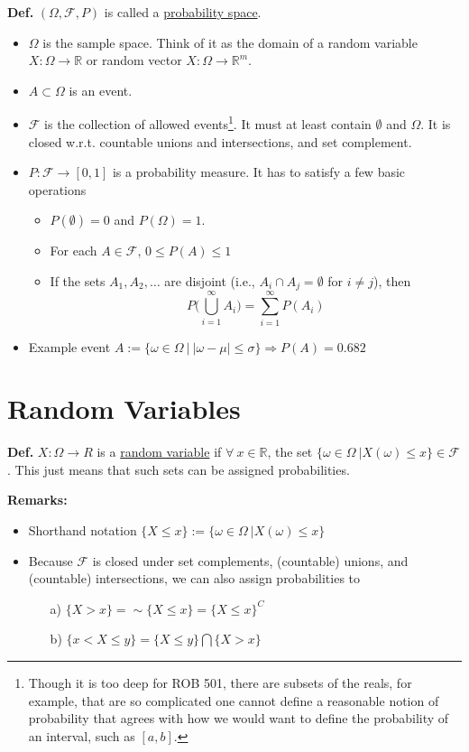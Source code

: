 \documentclass[letterpaper]{article}
\newcommand{\real}{\mathbb R}  %
\begin{document}
\textbf{Def.}  $(\Omega, \mathscr{F}, P)$ is called a \ul{probability space}.
\begin{itemize}
\item $\Omega$ is the sample space. Think of it as the domain of a random variable $X: \Omega \to \real$ or random vector $X: \Omega \to \real^m$.
\item $A \subset \Omega$ is an event.
\item $\mathscr{F}$ is the collection of allowed events\footnote{Though it is too deep for ROB 501, there are subsets of the reals, for example, that are so complicated one cannot define a reasonable notion of probability that agrees with how we would want to define the probability of an interval, such as $[a, b]$.}. It must at least contain $\emptyset$ and $\Omega$. It is closed w.r.t. countable unions and intersections, and set complement.
    \item $P:\mathscr{F} \to [0, 1]$ is a probability measure. It has to satisfy a few basic operations
    \begin{itemize}
    \item $P(\emptyset)=0$ and $P(\Omega)=1$.
    \item For each $A \in \mathscr{F}$, $0 \le P(A) \le 1$
    \item If the sets $A_1, A_2, \ldots $ are disjoint (i.e., $A_i \cap A_j = \emptyset$ for $i \neq j$), then
    $$P\big(\bigcup_{i=1}^{\infty}A_i\big) = \sum_{i=1}^{\infty} P(A_i) $$
    \end{itemize}
\item Example event $A:=\{ \omega \in \Omega ~ |~ |\omega-\mu |\le \sigma \} \Rightarrow P(A)=0.682$
\end{itemize}

\newpage

    \section{Random Variables}

 \textbf{Def.}    $X: \Omega \rightarrow R$ is a \ul{random variable} if $\forall ~x \in \real$, the set
 $\{\omega \in \Omega~| X(\omega) \le x\} \in \mathscr{F} $. This just means that such sets can be assigned probabilities.

 \textbf{Remarks:} \begin{itemize}
 \item Shorthand notation $\{ X \le x\}:=\{\omega \in \Omega~| X(\omega) \le x\}$
 \item Because $\mathscr{F}$ is closed under set complements, (countable) unions, and (countable) intersections, we can also assign probabilities to

     \begin{itemize}
     \item[a)] $\{ X > x\}=\sim \{ X \le x\} = \{ X \le x\}^{C}$
     \item[b)] $\{ x < X \le y\}=\{ X \le y\} \bigcap \{ X > x\}$
     \end{itemize}


 \end{itemize}
\end{document}
